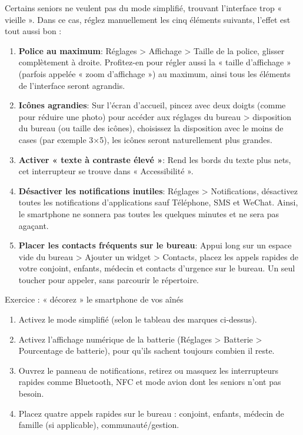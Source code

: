 
Certains seniors ne veulent pas du mode simplifié, trouvant l'interface trop « vieille ». Dans ce cas, réglez manuellement les cinq éléments suivants, l'effet est tout aussi bon :

\begin{enumerate}
  \item \textbf{Police au maximum}: Réglages > Affichage > Taille de la police, glisser complètement à droite. Profitez-en pour régler aussi la « taille d'affichage » (parfois appelée « zoom d'affichage ») au maximum, ainsi tous les éléments de l'interface seront agrandis.
  \item \textbf{Icônes agrandies}: Sur l'écran d'accueil, pincez avec deux doigts (comme pour réduire une photo) pour accéder aux réglages du bureau > disposition du bureau (ou taille des icônes), choisissez la disposition avec le moins de cases (par exemple 3×5), les icônes seront naturellement plus grandes.
  \item \textbf{Activer « texte à contraste élevé »}: Rend les bords du texte plus nets, cet interrupteur se trouve dans « Accessibilité ».
  \item \textbf{Désactiver les notifications inutiles}: Réglages > Notifications, désactivez toutes les notifications d'applications sauf Téléphone, SMS et WeChat. Ainsi, le smartphone ne sonnera pas toutes les quelques minutes et ne sera pas agaçant.
  \item \textbf{Placer les contacts fréquents sur le bureau}: Appui long sur un espace vide du bureau > Ajouter un widget > Contacts, placez les appels rapides de votre conjoint, enfants, médecin et contacts d'urgence sur le bureau. Un seul toucher pour appeler, sans parcourir le répertoire.
\end{enumerate}

\begin{tcbpractice}{Exercice : « décorez » le smartphone de vos aînés}
\begin{enumerate}
  \item Activez le mode simplifié (selon le tableau des marques ci-dessus).
  \item Activez l'affichage numérique de la batterie (Réglages > Batterie > Pourcentage de batterie), pour qu'ils sachent toujours combien il reste.
  \item Ouvrez le panneau de notifications, retirez ou masquez les interrupteurs rapides comme Bluetooth, NFC et mode avion dont les seniors n'ont pas besoin.
  \item Placez quatre appels rapides sur le bureau : conjoint, enfants, médecin de famille (si applicable), communauté/gestion.
\end{enumerate}

\end{tcbpractice}

